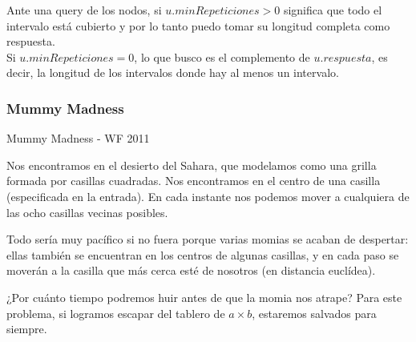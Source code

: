 \documentclass[compress]{beamer}
\begin{document}
\begin{frame}
Ante una query de los nodos, si $u.minRepeticiones > 0$ significa que 
todo el intervalo está cubierto y por lo tanto puedo tomar su longitud
completa como respuesta.\\

Si $u.minRepeticiones = 0$, lo que busco es el complemento de $u.respuesta$,
es decir, la longitud de los intervalos donde hay al menos un intervalo.
\end{frame}

\subsubsection{Mummy Madness}
\begin{frame}{Mummy Madness - WF 2011}

Nos encontramos en el desierto del Sahara, que modelamos como una grilla
formada por casillas cuadradas. Nos encontramos en el centro de una casilla
(especificada en la entrada). En cada instante nos podemos mover a cualquiera 
de las ocho casillas vecinas posibles.
\bigskip

Todo sería muy pacífico si no fuera porque varias momias se acaban de despertar:
ellas también se encuentran en los centros de algunas casillas, y en cada
paso se moverán a la casilla que más cerca esté de nosotros (en distancia euclídea).

\bigskip

¿Por cuánto tiempo podremos huir antes de que la momia nos atrape? Para este
problema, si logramos escapar del tablero de $a \times b$, estaremos salvados
para siempre.

\end{frame}
\end{document}
